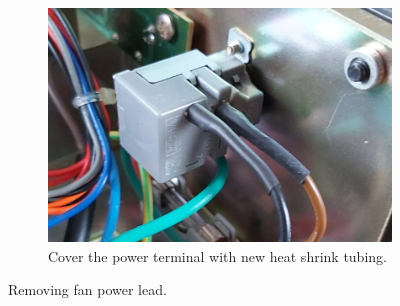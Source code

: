 \documentclass[twocolumn]{report}
\begin{document}
\begin{enumerate}
\begin{figure}[h!]
\begin{subfigure}[b]{\columnwidth}
		\includegraphics[width=\columnwidth]{images/psu-image-1b.jpg}
		\caption{Cover the power terminal with new heat shrink tubing.}
		\label{fig:tubing}
				\end{subfigure}
			\caption{Removing fan power lead.}
	\end{figure}
\end{enumerate}
\end{document}
